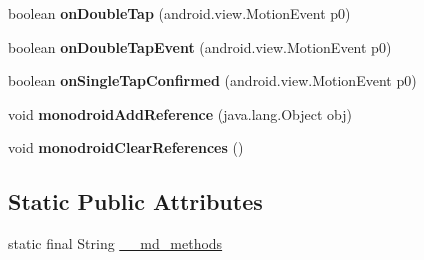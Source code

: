 \begin{DoxyCompactItemize}
boolean {\bfseries on\+Double\+Tap} (android.\+view.\+Motion\+Event p0)
\item 
\mbox{\label{classmd5b60ffeb829f638581ab2bb9b1a7f4f3f_1_1InnerGestureListener_a4fb3a871dc13a6a2394ece055ec3ca5e}} 
boolean {\bfseries on\+Double\+Tap\+Event} (android.\+view.\+Motion\+Event p0)
\item 
\mbox{\label{classmd5b60ffeb829f638581ab2bb9b1a7f4f3f_1_1InnerGestureListener_ac3640ab4d9f56cd4ca4bb118d64abaa4}} 
boolean {\bfseries on\+Single\+Tap\+Confirmed} (android.\+view.\+Motion\+Event p0)
\item 
\mbox{\label{classmd5b60ffeb829f638581ab2bb9b1a7f4f3f_1_1InnerGestureListener_af9a7e9fe86c58734ef4cf954524214b5}} 
void {\bfseries monodroid\+Add\+Reference} (java.\+lang.\+Object obj)
\item 
\mbox{\label{classmd5b60ffeb829f638581ab2bb9b1a7f4f3f_1_1InnerGestureListener_ae61db418045e7b1ed0459d348db52672}} 
void {\bfseries monodroid\+Clear\+References} ()
\end{DoxyCompactItemize}
\subsection*{Static Public Attributes}
\begin{DoxyCompactItemize}
\item 
static final String \hyperlink{classmd5b60ffeb829f638581ab2bb9b1a7f4f3f_1_1InnerGestureListener_ae6fdb0c574b25527e6407117dcb68256}{\+\_\+\+\_\+md\+\_\+methods}
\end{DoxyCompactItemize}
